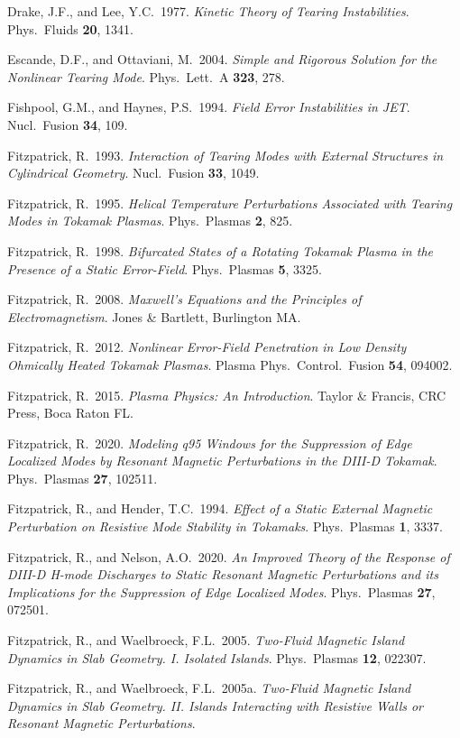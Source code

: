\documentclass[notitlepage,12pt]{article}
\begin{document}
\begin{description}
\item Drake, J.F., and Lee, Y.C.\ 1977. {\em Kinetic Theory of Tearing Instabilities}. Phys.\ Fluids {\bf 20}, 1341.
\item Escande, D.F., and Ottaviani, M.\ 2004. {\em Simple and Rigorous Solution for the Nonlinear Tearing Mode}. Phys.\ Lett.\ A {\bf 323}, 278. 
\item Fishpool, G.M., and Haynes, P.S.\ 1994. {\em Field Error Instabilities in JET}. Nucl.\ Fusion {\bf 34}, 109. 
\item Fitzpatrick, R.\ 1993. {\em Interaction of Tearing Modes with External Structures in Cylindrical Geometry}. Nucl.\ Fusion {\bf 33}, 1049. 
\item Fitzpatrick, R.\ 1995. {\em Helical Temperature Perturbations Associated with Tearing Modes in Tokamak Plasmas}. Phys.\ Plasmas {\bf 2}, 825. 
\item Fitzpatrick, R.\ 1998. {\em Bifurcated States of a Rotating Tokamak Plasma in the Presence of a Static Error-Field}. Phys.\ Plasmas {\bf 5}, 3325. 
\item Fitzpatrick, R.\ 2008. {\em Maxwell's Equations and the Principles of Electromagnetism}. Jones \& Bartlett, Burlington MA.
\item Fitzpatrick, R.\ 2012. {\em Nonlinear Error-Field Penetration in Low Density Ohmically Heated Tokamak Plasmas}. Plasma Phys.\ Control.\ Fusion {\bf 54}, 094002.
\item Fitzpatrick, R.\ 2015. {\em Plasma Physics: An Introduction}. Taylor \& Francis, CRC Press, Boca Raton FL.
\item Fitzpatrick, R.\ 2020. {\em Modeling q95 Windows for the Suppression of Edge Localized Modes by Resonant Magnetic Perturbations in the DIII-D Tokamak}. Phys.\ Plasmas {\bf 27}, 102511.
\item Fitzpatrick, R., and Hender, T.C.\ 1994. {\em Effect of a Static External Magnetic Perturbation on Resistive Mode Stability in Tokamaks}. Phys.\ Plasmas {\bf 1}, 3337. 
\item Fitzpatrick, R., and Nelson, A.O.\ 2020. {\em An Improved Theory of the Response of DIII-D H-mode Discharges to Static Resonant Magnetic Perturbations and its Implications for the Suppression of Edge Localized Modes}. Phys.\ Plasmas {\bf 27}, 072501.
\item Fitzpatrick, R., and Waelbroeck, F.L.\ 2005. {\em Two-Fluid Magnetic Island Dynamics in Slab Geometry. I. Isolated Islands}. Phys.\ Plasmas {\bf 12}, 022307. 
\item Fitzpatrick, R., and Waelbroeck, F.L.\ 2005a. {\em Two-Fluid Magnetic Island Dynamics in Slab Geometry. II. Islands Interacting with Resistive Walls or Resonant Magnetic Perturbations}.

\end{description}
\end{document}
